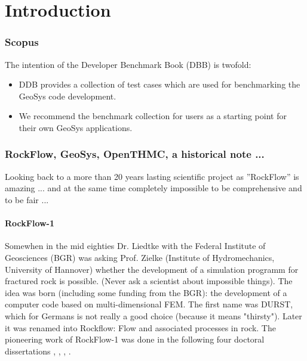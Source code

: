 \chapter{Introduction}

\subsection*{Scopus}

The intention of the Developer Benchmark Book (DBB) is twofold:
\begin{itemize}
  \item DDB provides a collection of test cases which are used for benchmarking the GeoSys code development.
  \item We recommend the benchmark collection for users as a starting point for their own GeoSys applications.
\end{itemize}

\subsection*{RockFlow, GeoSys, OpenTHMC, a historical note ...}

Looking back to a more than 20 years lasting scientific project as ''RockFlow'' is amazing ... and at the same time completely impossible to be comprehensive and to be fair ...

\subsubsection*{RockFlow-1}

Somewhen in the mid eighties Dr. Liedtke with the Federal Institute of Geosciences (BGR) was asking Prof. Zielke (Institute of Hydromechanics, University of Hannover) whether the development of a simulation programm for fractured rock is possible. (Never ask a scientist about impossible things). The idea was born (including some funding from the BGR): the development of a computer code based on multi-dimensional FEM. The first name was DURST, which for Germans is not really a good choice (because it means "thirsty"). Later it was renamed into Rockflow: Flow and associated processes in rock. The pioneering work of RockFlow-1 was done in the following four doctoral dissertations \cite{Kro:1990}, \cite{Wol:1991}, \cite{Hel:1993}, \cite{Sha:1994}.

